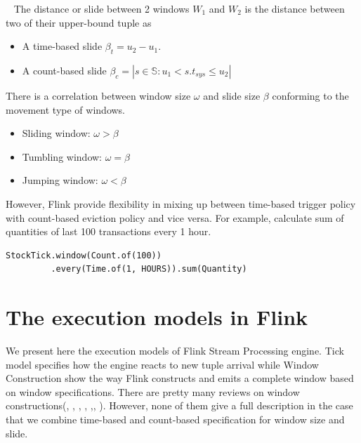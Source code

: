 \begin{enumerate}
\begin{defi}~\label{defi:window_slide}
The distance or slide between 2 windows $W_1$ and $W_2$ is the distance between two of their upper-bound tuple as
\begin{itemize}


\item  A time-based slide $\beta_{t} = u_2 - u_1$.  
\item A count-based slide $\beta_{c} = |{s \in \mathbb{S}: u_1 < s.t_{sys} \leq u_2}| $ 

\end{itemize}

\end{defi}

\end{enumerate}

There is a correlation between window size $\omega$ and slide size $\beta$  conforming to the movement type of windows.
\begin{itemize}
\item Sliding window: $\omega > \beta$ 
\item Tumbling window: $\omega = \beta$ 
\item Jumping window: $\omega < \beta$ 
\end{itemize}

However, Flink provide flexibility in mixing up between time-based trigger policy with count-based eviction policy and vice versa. For example,
calculate sum of quantities of last 100 transactions every 1 hour.
\begin{verbatim}
StockTick.window(Count.of(100))
		 .every(Time.of(1, HOURS)).sum(Quantity)
\end{verbatim}

\section{The execution models in Flink}
We present here the execution models of Flink Stream Processing engine. Tick model specifies how the engine reacts to new tuple arrival while Window Construction show the way Flink constructs and emits a complete window based on window specifications. There are pretty many reviews on window constructions(\citep{Kramer:2009}, \citep{Arasu:2004}, \citep{Ghanem:2008}, \citep{Law:2011}, \citep{Dindar:2013},\citep{Patroumpas:2006}, \citep{Jain:2008}). However, none of them give a full description in the case that we combine time-based and count-based specification for window size and slide.  

